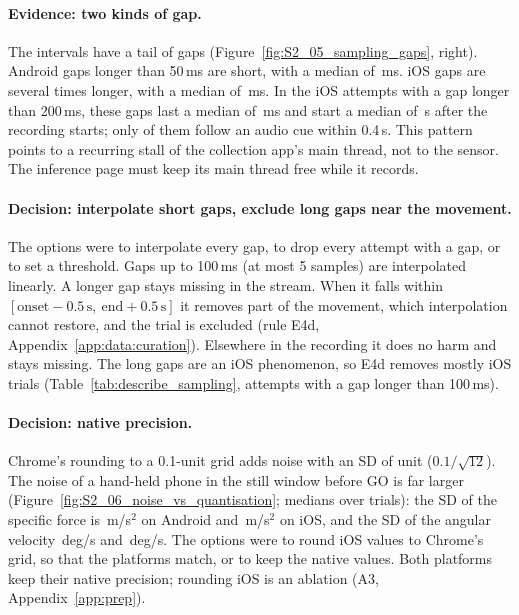 \paragraph{Evidence: two kinds of gap.} The intervals have a tail of gaps (Figure~\ref{fig:S2_05_sampling_gaps},
right). Android gaps longer than 50\,ms are short, with a median of \,ms. iOS
gaps are several times longer, with a median of \,ms. In the 
iOS attempts with a gap longer than 200\,ms, these gaps last a median of \,ms and
start a median of \,s after the recording starts; only
 of them follow an audio cue within 0.4\,s. This pattern points
to a recurring stall of the collection app's main thread, not to the sensor. The inference page must keep its
main thread free while it records.

\paragraph{Decision: interpolate short gaps, exclude long gaps near the movement.} The options were to
interpolate every gap, to drop every attempt with a gap, or to set a threshold. Gaps up to 100\,ms (at most
5 samples) are interpolated linearly. A longer gap stays missing in the stream. When it falls within
$[\text{onset} - 0.5\,\text{s},\ \text{end} + 0.5\,\text{s}]$ it removes part of the movement, which
interpolation cannot restore, and the trial is excluded (rule E4d, Appendix~\ref{app:data:curation}). Elsewhere
in the recording it does no harm and stays missing. The long gaps are an iOS phenomenon, so E4d removes mostly
iOS trials (Table~\ref{tab:describe_sampling}, attempts with a gap longer than 100\,ms).

\paragraph{Decision: native precision.} Chrome's rounding to a 0.1-unit grid adds noise with an SD of
 unit ($0.1/\sqrt{12}$). The noise of a hand-held phone in the still window
before GO is far larger (Figure~\ref{fig:S2_06_noise_vs_quantisation}; medians over trials): the SD of the
specific force is \,m/s$^2$ on Android and \,m/s$^2$
on iOS, and the SD of the angular velocity \,deg/s and
\,deg/s. The options were to round iOS values to Chrome's grid, so that the
platforms match, or to keep the native values. Both platforms keep their native precision; rounding iOS is an
ablation (A3, Appendix~\ref{app:prep}).

